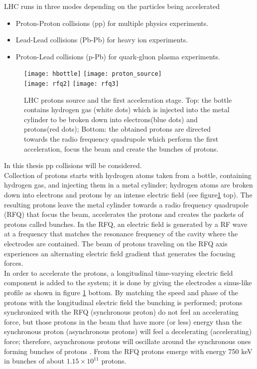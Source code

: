 \noindent LHC runs in three modes depending on the particles being accelerated

\begin{itemize}
\item Proton-Proton collisions (pp) for multiple physics experiments.
\item Lead-Lead collisions (Pb-Pb) for heavy ion experiments. 
\item Proton-Lead collisions (p-Pb) for quark-gluon plasma experiments.
\end{itemize}

\begin{figure}[!h]
\centering
\texttt{[image: hbottle]}
\texttt{[image: proton\_source]}\\
\texttt{[image: rfq2]}
\texttt{[image: rfq3]}
\caption[LHC protons source. First acceleration stage.]{LHC protons source and the first acceleration stage. Top: the bottle contains hydrogen gas (white dots) which is injected into the metal cylinder to be broken down into electrons(blue dots) and protons(red dots); Bottom: the obtained protons are directed towards the radio frequency quadrupole which perform the first acceleration, focus the beam and create the bunches of protons.\cite{rfq2,video}}\label{fig:hbottle}
\end{figure}

\noindent In this thesis pp collisions will be considered.\\

\noindent Collection of protons starts with hydrogen atoms taken from a bottle, containing hydrogen gas, and injecting them in a metal cylinder; hydrogen atoms are broken down into electrons and protons by an intense electric field (see figure\ref{fig:hbottle} top). The resulting protons leave the metal cylinder towards a radio frequency quadrupole (RFQ) that focus the beam, accelerates the protons and creates the packets of protons called bunches. In the RFQ, an electric field is generated by a RF wave at a frequency that matches the resonance frequency of the cavity where the electrodes are contained. The beam of protons traveling on the RFQ axis experiences an alternating electric field gradient that generates the focusing forces.\\

\noindent In order to accelerate the protons, a longitudinal time-varying electric field component is added to the system; it is done by giving the electrodes a sinus-like profile as shown in figure \ref{fig:hbottle} bottom. By matching the speed and phase of the protons with the longitudinal electric field the bunching is performed; protons synchronized with the RFQ (synchronous proton) do not feel an accelerating force, but those protons in the beam that have more (or less) energy than the synchronous proton (asynchronous protons) will feel a decelerating (accelerating) force; therefore, asynchronous protons will oscillate around the synchronous ones forming bunches of protons \cite{rfq}. From the RFQ protons emerge with energy 750 keV in bunches of about $1.15 \times 10^{11}$ protons\cite{lyndon}.        

